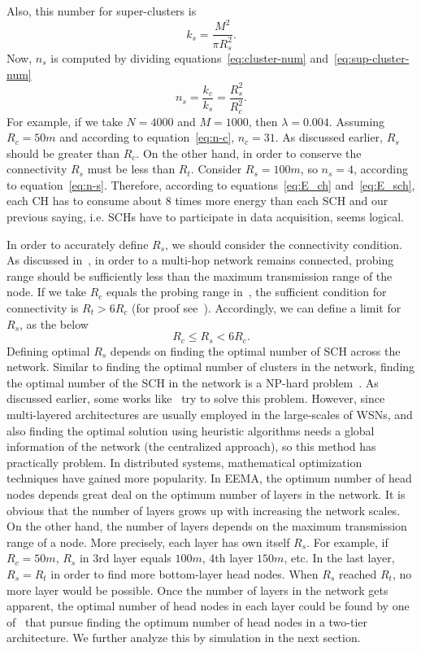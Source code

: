 \documentclass[journal]{IEEEtran}
\begin{document}
Also, this number for super-clusters is
\begin{equation}
\label{eq:sup-cluster-num}
k_s=\frac{M^2}{\pi R_{s}^2}. 
\end{equation}
Now, $n_s$ is computed by dividing equations~\eqref{eq:cluster-num} and~\eqref{eq:sup-cluster-num}
\begin{equation}
\label{eq:n-s}
n_s=\frac{k_c}{k_s}=\frac{R_{s}^2}{R_{c}^2}. 
\end{equation}
For example, if we take $N=4000$ and $M=1000$, then $\lambda=0.004$.  Assuming $R_c=50m$ and according to equation~\eqref{eq:n-c}, $n_c=31$.  As discussed earlier, $R_s$ should be greater than $R_c$.  On the other hand, in order to conserve the connectivity $R_s$ must be less than $R_t$.  Consider $R_s=100m$, so $n_s=4$, according to equation~\eqref{eq:n-s}.  Therefore, according to equations~\eqref{eq:E_ch} and~\eqref{eq:E_sch}, each CH has to consume about 8 times more energy than each SCH and our previous saying, i.e. SCHs have to participate in data acquisition, seems logical.

In order to accurately define $R_{s}$, we should consider the connectivity condition.  As discussed in~\cite{PEAS2003}, in order to a multi-hop network remains connected, probing range should be sufficiently less than the maximum transmission range of the node.  If we take $R_c$ equals the probing range in~\cite{PEAS2003}, the sufficient condition for connectivity is $R_{t}>6R_c$ (for proof see~\cite{PEAS2003}).  Accordingly, we can define a limit for $R_s$, as the below
\begin{equation}
\label{eq:limit}
R_c \leq R_{s} < 6R_{c}. 
\end{equation}
Defining optimal $R_s$ depends on finding the optimal number of SCH across the network.  Similar to finding the optimal number of clusters in the network, finding the optimal number of the SCH in the network is a NP-hard problem~\cite{brief-sur}.  As discussed earlier, some works like~\cite{karaki2004}\cite{karaki2009} try to solve this problem.  However, since multi-layered architectures are usually employed in the large-scales of WSNs, and also finding the optimal solution using heuristic algorithms needs a global information of the network (the centralized approach), so this method has practically problem.  In distributed systems, mathematical optimization techniques have gained more popularity.  In EEMA, the optimum number of head nodes depends great deal on the optimum number of layers in the network.  It is obvious that the number of layers grows up with increasing the network scales.  On the other hand, the number of layers depends on the maximum transmission range of a node.  More precisely, each layer has own itself $R_s$.  For example, if $R_c=50m$, $R_s$ in 3rd layer equals $100m$, 4th layer $150m$, etc.  In the last layer, $R_s=R_t$ in order to find more bottom-layer head nodes.  When $R_s$ reached $R_t$, no more layer would be possible.  Once the number of layers in the network gets apparent, the optimal number of head nodes in each layer could be found by one of~\cite{Heinzelman2002}\cite{opt-num-clu2004}\cite{optimalwang2009} that pursue finding the optimum number of head nodes in a two-tier architecture.  We further analyze this by simulation in the next section.
\end{document}
